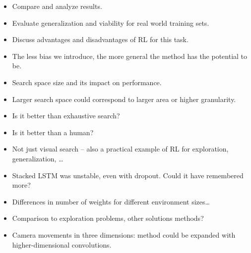 







\begin{itemize}
    \item Compare and analyze results.
    \item Evaluate generalization and viability for real world training sets. 
    \item Discuss advantages and disadvantages of RL for this task.
    \item The less bias we introduce, the more general the method has the potential to be.
    \item Search space size and its impact on performance.
    \item Larger search space could correspond to larger area or higher granularity.
    \item Is it better than exhaustive search?
    \item Is it better than a human?
    \item Not just visual search -- also a practical example of RL for exploration, generalization, \dots
    \item Stacked LSTM was unstable, even with dropout. Could it have remembered more?
    \item Differences in number of weights for different environment sizes\dots
    \item Comparison to exploration problems, other solutions methods?
    \item Camera movements in three dimensions: method could be expanded with higher-dimensional convolutions. 
\end{itemize}

